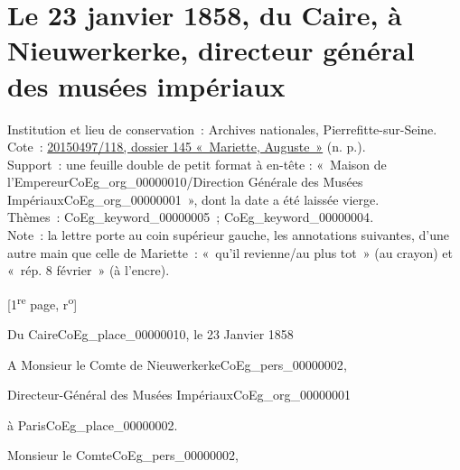 \documentclass{book}
\begin{document}
{\section*{Le 23 janvier 1858, du Caire, à Nieuwerkerke, directeur général des musées impériaux}  
{\footnotesize
\noindent Institution et lieu de conservation~: Archives nationales, Pierrefitte-sur-Seine.\\
Cote~: \hyperlink{CoEg_Mariette_ms_001}{20150497/118, dossier 145 «~Mariette, Auguste~»} (n. p.).\\
Support~: une feuille double de petit format à en-tête : «~Maison de l'Empereur\gls{CoEg_org_00000010}/Direction Générale des Musées Impériaux\gls{CoEg_org_00000001}~», dont la date a été laissée vierge.\\
Thèmes~: \gls{CoEg_keyword_00000005}~; \gls{CoEg_keyword_00000004}.\\
Note~: la lettre porte au coin supérieur gauche, les annotations suivantes, d’une autre main que celle de Mariette~: «~qu’il revienne/au plus tot~» (au crayon) et «~rép. 8 février~» (à l’encre).
\begin{center} {[1\textsuperscript{re} page, r\textsuperscript{o}]}\end{center}}

\begin{flushright} Du Caire\gls{CoEg_place_00000010}, le 23 Janvier 1858\end{flushright}

\indent A Monsieur le Comte de Nieuwerkerke\gls{CoEg_pers_00000002},
\begin{center}Directeur-Général des Musées Impériaux\gls{CoEg_org_00000001}\end{center}
\begin{flushright}à Paris\gls{CoEg_place_00000002}.\end{flushright}

\hspace{1cm} Monsieur le Comte\gls{CoEg_pers_00000002},\\

}
\end{document}
